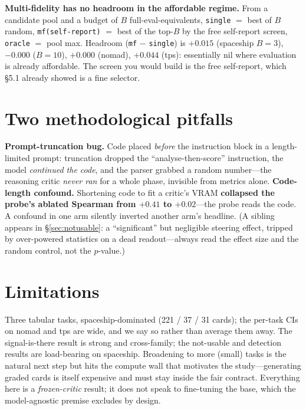 \documentclass[10pt]{article}
\newcommand{\code}[1]{\texttt{#1}}
\begin{document}
\textbf{Multi-fidelity has no headroom in the affordable regime.} From a candidate pool and a budget of $B$ full-eval-equivalents, \code{single} $=$ best of $B$ random, \code{mf(self-report)} $=$ best of the top-$B$ by the free self-report screen, \code{oracle} $=$ pool max. Headroom (\code{mf} $-$ \code{single}) is ${+}0.015$ (spaceship $B{=}3$), $-0.000$ ($B{=}10$), ${+}0.000$ (nomad), ${+}0.044$ (tps): essentially nil where evaluation is already affordable. The screen you would build is the free self-report, which \S5.1 already showed is a fine selector.

\section{Two methodological pitfalls}\label{sec:pitfalls}
\textbf{Prompt-truncation bug.} Code placed \emph{before} the instruction block in a length-limited prompt: truncation dropped the ``analyse-then-score'' instruction, the model \emph{continued the code}, and the parser grabbed a random number---the reasoning critic \emph{never ran} for a whole phase, invisible from metrics alone.
\textbf{Code-length confound.} Shortening code to fit a critic's VRAM \textbf{collapsed the probe's ablated Spearman from ${+}0.41$ to ${+}0.02$}---the probe reads the code. A confound in one arm silently inverted another arm's headline. (A sibling appears in \S\ref{sec:notusable}: a ``significant'' but negligible steering effect, tripped by over-powered statistics on a dead readout---always read the effect size and the random control, not the $p$-value.)

\section{Limitations}
Three tabular tasks, spaceship-dominated (221 / 37 / 31 cards); the per-task CIs on nomad and tps are wide, and we say so rather than average them away. The signal-is-there result is strong and cross-family; the not-usable and detection results are load-bearing on spaceship. Broadening to more (small) tasks is the natural next step but hits the compute wall that motivates the study---generating graded cards is itself expensive and must stay inside the fair contract. Everything here is a \emph{frozen-critic} result; it does not speak to fine-tuning the base, which the model-agnostic premise excludes by design.
\end{document}
